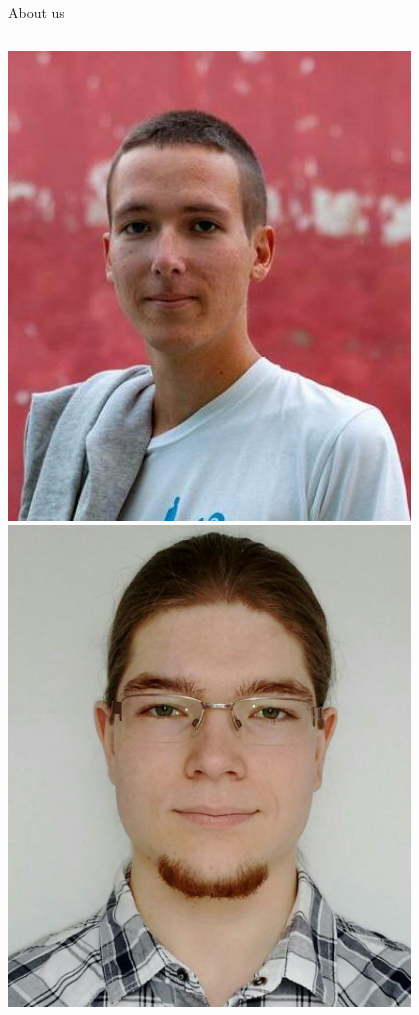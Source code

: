 \documentclass[NET,english,aspectratio=169,notitleframe]{tumbeamer}
\begin{document}
\begin{frame}{About us}
\begin{columns}
\begin{column}{0.15\textwidth}
\includegraphics[width=0.8\textwidth]{pics/simon.jpg}\\
\includegraphics[width=0.8\textwidth]{pics/sebastian.jpg}
\end{column}
\end{columns}
\end{frame}
\end{document}

